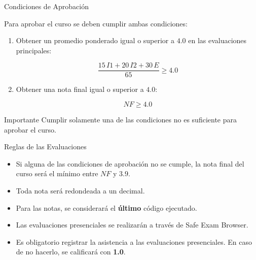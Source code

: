 \documentclass{beamer}
\begin{document}
    \begin{frame}{Condiciones de Aprobación}

        Para aprobar el curso se deben cumplir ambas condiciones:
        
        \begin{enumerate}
            \item Obtener un promedio ponderado igual o superior a $4.0$
            en las evaluaciones principales:
        
            \[
            \frac{15\,I1 + 20\,I2 + 30\,E}{65} \geq 4.0
            \]
        
            \item Obtener una nota final igual o superior a $4.0$:
        
            \[
            NF \geq 4.0
            \]
        \end{enumerate}
        
        \begin{exampleblock}{Importante}
        Cumplir solamente una de las condiciones no es suficiente para
        aprobar el curso.
        \end{exampleblock}
        
    \end{frame}

    \begin{frame}{Reglas de las Evaluaciones}
        \begin{itemize}
            \item Si alguna de las condiciones de aprobación no se cumple,
            la nota final del curso será el mínimo entre $NF$ y $3.9$.
            \item Toda nota será redondeada a un decimal.
            \item Para las notas, se considerará el \textbf{último} código ejecutado.
            \item Las evaluaciones presenciales se realizarán a través de Safe Exam Browser.
            \item Es obligatorio registrar la asistencia a las evaluaciones presenciales. 
            En caso de no hacerlo, se calificará con \textbf{1.0}.
        \end{itemize}
    \end{frame}
\end{document}
